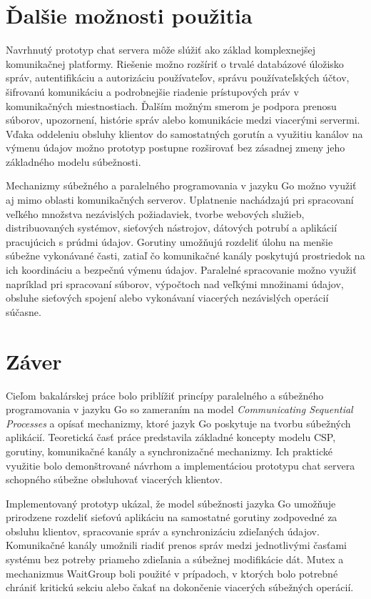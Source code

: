 \documentclass[
  biblatex,
  seconds=true,
  language=slovak,
  figures=false,
  urldate=iso,
  glossaries,
  index
]{kidiplom}
\begin{document}
\newpage
\section{Ďalšie možnosti použitia}

Navrhnutý prototyp chat servera môže slúžiť ako základ komplexnejšej komunikačnej platformy. Riešenie možno rozšíriť o trvalé databázové úložisko správ, autentifikáciu a autorizáciu používateľov, správu používateľských účtov, šifrovanú komunikáciu a podrobnejšie riadenie prístupových práv v komunikačných miestnostiach. Ďalším možným smerom je podpora prenosu súborov, upozornení, histórie správ alebo komunikácie medzi viacerými servermi. Vďaka oddeleniu obsluhy klientov do samostatných gorutín a využitiu kanálov na výmenu údajov možno prototyp postupne rozširovať bez zásadnej zmeny jeho základného modelu súbežnosti.

Mechanizmy súbežného a paralelného programovania v jazyku Go možno využiť aj mimo oblasti komunikačných serverov. Uplatnenie nachádzajú pri spracovaní veľkého množstva nezávislých požiadaviek, tvorbe webových služieb, distribuovaných systémov, sieťových nástrojov, dátových potrubí a aplikácií pracujúcich s prúdmi údajov. Gorutiny umožňujú rozdeliť úlohu na menšie súbežne vykonávané časti, zatiaľ čo komunikačné kanály poskytujú prostriedok na ich koordináciu a bezpečnú výmenu údajov. Paralelné spracovanie možno využiť napríklad pri spracovaní súborov, výpočtoch nad veľkými množinami údajov, obsluhe sieťových spojení alebo vykonávaní viacerých nezávislých operácií súčasne.

\newpage
\section{Záver}

Cieľom bakalárskej práce bolo priblížiť princípy paralelného a súbežného programovania v jazyku Go so zameraním na model \textit{Communicating Sequential Processes} a opísať mechanizmy, ktoré jazyk Go poskytuje na tvorbu súbežných aplikácií. Teoretická časť práce predstavila základné koncepty modelu CSP, gorutiny, komunikačné kanály a synchronizačné mechanizmy. Ich praktické využitie bolo demonštrované návrhom a implementáciou prototypu chat servera schopného súbežne obsluhovať viacerých klientov.

Implementovaný prototyp ukázal, že model súbežnosti jazyka Go umožňuje prirodzene rozdeliť sieťovú aplikáciu na samostatné gorutiny zodpovedné za obsluhu klientov, spracovanie správ a synchronizáciu zdieľaných údajov. Komunikačné kanály umožnili riadiť prenos správ medzi jednotlivými časťami systému bez potreby priameho zdieľania a súbežnej modifikácie dát. Mutex a mechanizmus WaitGroup boli použité v prípadoch, v ktorých bolo potrebné chrániť kritickú sekciu alebo čakať na dokončenie viacerých súbežných operácií.
\end{document}
